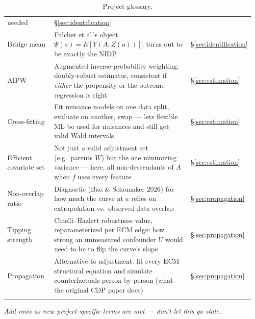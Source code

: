 \begin{longtable}{@{}p{3.1cm}p{7.4cm}p{2.4cm}@{}}
  needed & \S\ref{sec:identification} \\
Bridge mean & Fulcher et al.'s object $\Psi(a)=E[Y(A,Z(a))]$; turns out to
  be exactly the NIDP & \S\ref{sec:identification} \\
AIPW & Augmented inverse-probability weighting: doubly-robust estimator,
  consistent if \emph{either} the propensity or the outcome regression is
  right & \S\ref{sec:estimation} \\
Cross-fitting & Fit nuisance models on one data split, evaluate on another,
  swap --- lets flexible ML be used for nuisances and still get valid Wald
  intervals & \S\ref{sec:estimation} \\
Efficient covariate set & Not just \emph{a} valid adjustment set (e.g.\
  parents $W$) but the one minimizing variance --- here, all
  non-descendants of $A$ when $f$ uses every feature &
  \S\ref{sec:estimation} \\
Non-overlap ratio & Diagnostic (Bao \& Schomaker 2026) for how much the
  curve at $a$ relies on extrapolation vs.\ observed data overlap &
  \S\ref{sec:propagation} \\
Tipping strength & Cinelli--Hazlett robustness value, reparameterized per
  ECM edge: how strong an unmeasured confounder $U$ would need to be to flip
  the curve's slope & \S\ref{sec:propagation} \\
Propagation & Alternative to adjustment: fit every ECM structural equation
  and simulate counterfactuals person-by-person (what the original CDP
  paper does) & \S\ref{sec:propagation} \\
\bottomrule
\caption{Project glossary.}
\label{tab:glossary}
\end{longtable}

\emph{Add rows as new project-specific terms are met --- don't let this go
stale.}
